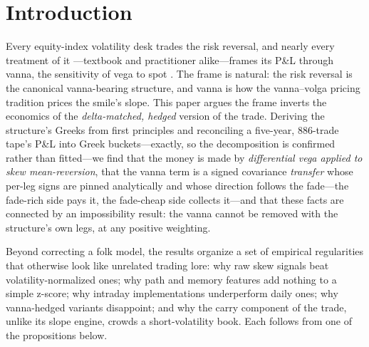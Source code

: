 \documentclass[11pt]{article}
\begin{document}
\begin{abstract}
exactly; fixed-block bootstrap intervals (5{,}000 draws,
21-trading-day blocks on the persisted daily bucket series) put the slope share's sign at
99.7\% stability, the vanna share's at 94\%. (5) Orthogonality belongs to the
\emph{strategy}, not the factor: the signed slope P\&L is empirically orthogonal to market and
volatility factors ($R^2 = 0.008$; 102\% of Sharpe retained after neutralization) even though
the raw slope innovation is not, while the carry component loads on volatility changes and is
closet short-variance. Finally we derive the hedging bound: removing the vanna drag requires
two additional strikes solving a $2\times 2$ system, and the achievable improvement is capped
by the drag removed minus the hedge legs' recurring spread cost; forty-five realistic
implementations of this hedge all reduce performance. The delta-matched risk reversal is a
skew-reversion engine on its cheap side and a carry collector on its rich side, with a
spot--volatility transfer flowing from the latter---not a vanna trade with skew decoration.
The vanna account is not wrong about the coupling; it is wrong about who pays.
\end{abstract}

\section{Introduction}
Every equity-index volatility desk trades the risk reversal, and nearly every treatment of it
---textbook and practitioner alike---frames its P\&L through vanna, the sensitivity of vega to
spot \citep{sinclair, cm}. The frame is natural: the risk reversal is the canonical
vanna-bearing structure, and vanna is how the vanna--volga pricing tradition prices the smile's
slope. This paper argues the frame inverts the economics of the \emph{delta-matched, hedged}
version of the trade. Deriving the structure's Greeks from first principles and reconciling a
five-year, 886-trade tape's P\&L into Greek buckets---exactly, so the decomposition is
confirmed rather than fitted---we find that the money is made by \emph{differential vega
applied to skew mean-reversion}, that the vanna term is a signed covariance \emph{transfer}
whose per-leg signs are pinned analytically and whose direction follows the fade---the
fade-rich side pays it, the fade-cheap side collects it---and that these facts are connected by
an impossibility result:
the vanna cannot be removed with the structure's own legs, at any positive weighting.

Beyond correcting a folk model, the results organize a set of empirical regularities that
otherwise look like unrelated trading lore: why raw skew signals beat volatility-normalized
ones; why path and memory features add nothing to a simple z-score; why intraday
implementations underperform daily ones; why vanna-hedged variants disappoint; and why the
carry component of the trade, unlike its slope engine, crowds a short-volatility book. Each
follows from one of the propositions below.
\end{document}
